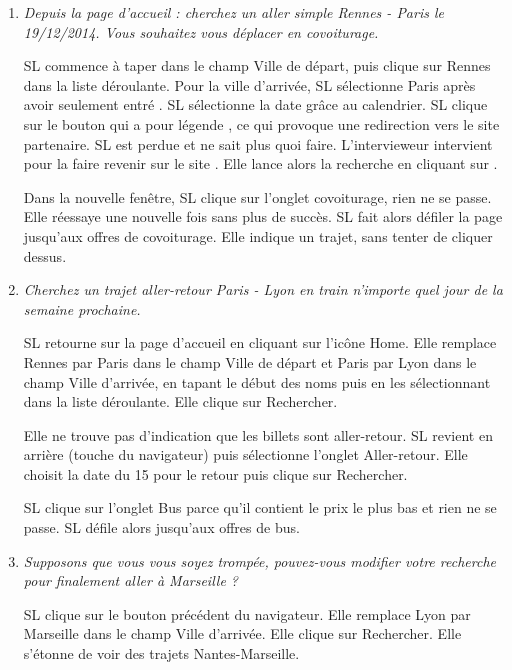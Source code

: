\begin{enumerate}
\item \textit{Depuis la page d'accueil : cherchez un aller simple Rennes - Paris le 19/12/2014. Vous souhaitez vous d\'{e}placer en covoiturage.}

SL commence \`{a} taper  dans le champ \og{}Ville de d\'{e}part\fg{}, puis clique sur Rennes dans la liste d\'{e}roulante. Pour la ville d'arriv\'{e}e, SL s\'{e}lectionne Paris apr\`{e}s avoir seulement entr\'{e} .
SL s\'{e}lectionne la date gr\^{a}ce au calendrier.
SL clique sur le bouton qui a pour l\'{e}gende , ce qui provoque une redirection vers le site partenaire. SL est perdue et ne sait plus quoi faire. L'intervieweur intervient pour la faire revenir sur le site \kel.
Elle lance alors la recherche en cliquant sur .

Dans la nouvelle fen\^{e}tre, SL clique sur l'onglet covoiturage, rien ne se passe. Elle r\'{e}essaye une nouvelle fois sans plus de succ\`{e}s. SL fait alors d\'{e}filer la page jusqu'aux offres de covoiturage. Elle indique un trajet, sans tenter de cliquer dessus.



\item \textit{Cherchez un trajet aller-retour Paris - Lyon en train n'importe quel jour de la semaine prochaine.}

SL retourne sur la page d'accueil en cliquant sur l'ic\^{o}ne \og{}Home\fg{}. 
Elle remplace Rennes par Paris dans le champ \og{}Ville de d\'{e}part\fg{} et Paris par Lyon dans le champ \og{}Ville d'arriv\'{e}e\fg{}, en tapant le d\'{e}but des noms puis en les s\'{e}lectionnant dans la liste d\'{e}roulante. 
Elle clique sur \og{}Rechercher\fg{}.

Elle ne trouve pas d'indication que les billets sont aller-retour. SL revient en arri\`{e}re (touche  du navigateur) puis s\'{e}lectionne l'onglet \og{}Aller-retour\fg{}. Elle choisit la date du 15 pour le retour puis clique sur \og{}Rechercher\fg{}.

SL clique sur l'onglet \og{}Bus\fg{} parce qu'il contient le prix le plus bas et rien ne se passe. SL d\'{e}file alors jusqu'aux offres de bus.


\item \textit{Supposons que vous vous soyez tromp\'{e}e, pouvez-vous modifier votre recherche pour finalement aller \`{a} Marseille ?}

SL clique sur le bouton pr\'{e}c\'{e}dent du navigateur. 
Elle remplace Lyon par Marseille dans le champ \og{}Ville d'arriv\'{e}e\fg{}. 
Elle clique sur \og{}Rechercher\fg{}.
Elle s'\'{e}tonne de voir des trajets Nantes-Marseille.



\end{enumerate}

